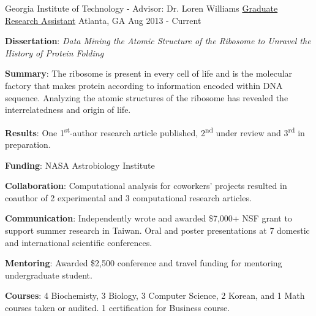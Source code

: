 

\begin{cventries}

  \cventry
    {Georgia Institute of Technology - Advisor: Dr. Loren Williams} %
    {\href{https://scholar.google.com/citations?hl=en&user=KIFFrX4AAAAJ&view_op=list_works&gmla=AJsN-F6ZS9ZeLqMG4o6JCZS87HLjoP76wA4kFValw4xx0A6ZWJJoxCWe2xu6VZvt_LgEw9YpCglVTlKY_5PfKpxiyghYFxLPNm5zrUwdBE5Fn-Sr098nt7NJGM2cH5l47IrTsSra8Vob}{Graduate Research Assistant}} %
    {Atlanta, GA} %
    {Aug 2013 - Current} %
    {{\textbf{Dissertation}: \textit{Data Mining the Atomic Structure of the Ribosome to Unravel the History of Protein Folding}}
      \begin{cvitems} %
      \vspace{4.0mm}
        \item \textbf{Summary}: The ribosome is present in every cell of life and is the molecular factory that makes protein according to information encoded within DNA sequence. Analyzing the atomic structures of the ribosome has revealed the interrelatedness and origin of life.
        \item \textbf{Results}: One 1\textsuperscript{st}-author research article published, 2\textsuperscript{nd} under review and 3\textsuperscript{rd} in preparation.
        \item \textbf{Funding}: NASA Astrobiology Institute
        \item \textbf{Collaboration}: Computational analysis for coworkers' projects resulted in coauthor of 2 experimental and 3 computational research articles.
        \item \textbf{Communication}: Independently wrote and awarded \$7,000+ NSF grant to support summer research in Taiwan. Oral and poster presentations at 7 domestic and international scientific conferences.
        \item \textbf{Mentoring}: Awarded \$2,500 conference and travel funding for mentoring undergraduate student.
        \item \textbf{Courses}: 4 Biochemisty, 3 Biology, 3 Computer Science, 2 Korean, and 1 Math courses taken or audited. 1 certification for Business course. 
      \end{cvitems}
    }


\end{cventries}
